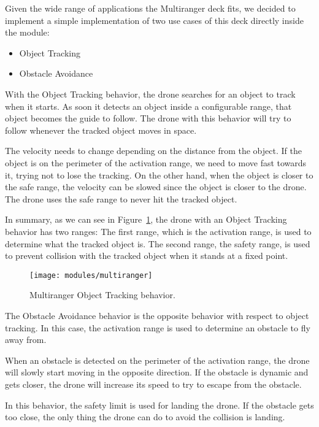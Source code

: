 Given the wide range of applications the Multiranger deck fits, we decided to implement a simple implementation of two use cases of this deck directly inside the module:
\begin{itemize}
    \item Object Tracking 
    \item Obstacle Avoidance
\end{itemize}

With the Object Tracking behavior, the drone searches for an object to track when it starts. 
As soon it detects an object inside a configurable range, that object becomes the guide to follow. 
The drone with this behavior will try to follow whenever the tracked object moves in space. 

The velocity needs to change depending on the distance from the object. 
If the object is on the perimeter of the activation range, we need to move fast towards it, trying not to lose the tracking. 
On the other hand, when the object is closer to the safe range, the velocity can be slowed since the object is closer to the drone.
The drone uses the safe range to never hit the tracked object.

In summary, as we can see in Figure~\ref{fig:multiranger_tracking}, the drone with an Object Tracking behavior has two ranges:
The first range, which is the activation range, is used to determine what the tracked object is.
The second range, the safety range, is used to prevent collision with the tracked object when it stands at a fixed point.

\begin{figure}[tb]
    \centering
    \texttt{[image: modules/multiranger]}
    \caption{Multiranger Object Tracking behavior.}\label{fig:multiranger_tracking}
\end{figure}

The Obstacle Avoidance behavior is the opposite behavior with respect to object tracking. 
In this case, the activation range is used to determine an obstacle to fly away from.

When an obstacle is detected on the perimeter of the activation range, the drone will slowly start moving in the opposite direction. 
If the obstacle is dynamic and gets closer, the drone will increase its speed to try to escape from the obstacle.

In this behavior, the safety limit is used for landing the drone. 
If the obstacle gets too close, the only thing the drone can do to avoid the collision is landing.

